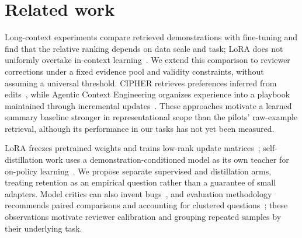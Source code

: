 \documentclass[10pt,twocolumn,letterpaper]{article}
\newcommand{\claim}[2]{#2}
\begin{document}
\section{Related work}
\claim{C12}{Long-context experiments compare retrieved demonstrations with fine-tuning and find that the relative ranking depends on data scale and task; LoRA does not uniformly overtake in-context learning~\cite{bertsch}.}
\claim{C13}{We extend this comparison to reviewer corrections under a fixed evidence pool and validity constraints, without assuming a universal threshold.}
\claim{C14}{CIPHER retrieves preferences inferred from edits~\cite{gao}, while Agentic Context Engineering organizes experience into a playbook maintained through incremental updates~\cite{ace}.}
\claim{C15}{These approaches motivate a learned summary baseline stronger in representational scope than the pilots' raw-example retrieval, although its performance in our tasks has not yet been measured.}

\claim{C16}{LoRA freezes pretrained weights and trains low-rank update matrices~\cite{lora}; self-distillation work uses a demonstration-conditioned model as its own teacher for on-policy learning~\cite{sdft}.}
\claim{C17}{We propose separate supervised and distillation arms, treating retention as an empirical question rather than a guarantee of small adapters.}
\claim{C18}{Model critics can also invent bugs~\cite{critics}, and evaluation methodology recommends paired comparisons and accounting for clustered questions~\cite{miller}; these observations motivate reviewer calibration and grouping repeated samples by their underlying task.}
\end{document}

